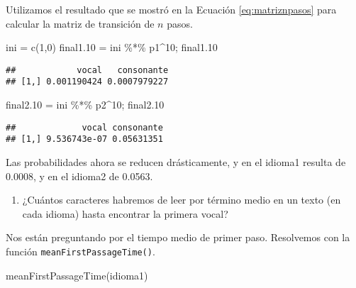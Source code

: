 \documentclass[
]{book}
\newenvironment{Shaded}{\begin{snugshade}}{\end{snugshade}}
\newcommand{\DecValTok}[1]{\textcolor[rgb]{0.00,0.00,0.81}{#1}}
\newcommand{\FloatTok}[1]{\textcolor[rgb]{0.00,0.00,0.81}{#1}}
\newcommand{\FunctionTok}[1]{\textcolor[rgb]{0.00,0.00,0.00}{#1}}
\newcommand{\NormalTok}[1]{#1}
\newcommand{\OtherTok}[1]{\textcolor[rgb]{0.56,0.35,0.01}{#1}}
\newcommand{\SpecialCharTok}[1]{\textcolor[rgb]{0.00,0.00,0.00}{#1}}
\providecommand{\tightlist}{%
  \setlength{\itemsep}{0pt}\setlength{\parskip}{0pt}}
\theoremstyle{definition}
\theoremstyle{definition}
\theoremstyle{definition}
\theoremstyle{definition}
\theoremstyle{remark}
\begin{document}
Utilizamos el resultado que se mostró en la Ecuación \eqref{eq:matriznpasos} para calcular la matriz de transición de \(n\) pasos.

\begin{Shaded}
\begin{Highlighting}[]
\NormalTok{ini }\OtherTok{=} \FunctionTok{c}\NormalTok{(}\DecValTok{1}\NormalTok{,}\DecValTok{0}\NormalTok{)}
\NormalTok{final1}\FloatTok{.10} \OtherTok{=}\NormalTok{ ini }\SpecialCharTok{\%*\%}\NormalTok{ p1}\SpecialCharTok{\^{}}\DecValTok{10}\NormalTok{; final1}\FloatTok{.10}
\end{Highlighting}
\end{Shaded}

\begin{verbatim}
##            vocal   consonante
## [1,] 0.001190424 0.0007979227
\end{verbatim}

\begin{Shaded}
\begin{Highlighting}[]
\NormalTok{final2}\FloatTok{.10} \OtherTok{=}\NormalTok{ ini }\SpecialCharTok{\%*\%}\NormalTok{ p2}\SpecialCharTok{\^{}}\DecValTok{10}\NormalTok{; final2}\FloatTok{.10}
\end{Highlighting}
\end{Shaded}

\begin{verbatim}
##             vocal consonante
## [1,] 9.536743e-07 0.05631351
\end{verbatim}

Las probabilidades ahora se reducen drásticamente, y en el idioma1 resulta de 0.0008, y en el idioma2 de 0.0563.

\begin{enumerate}
\def\labelenumi{\arabic{enumi}.}
\setcounter{enumi}{2}
\tightlist
\item
  ¿Cuántos caracteres habremos de leer por término medio en un texto (en cada idioma) hasta encontrar la primera vocal?
\end{enumerate}

Nos están preguntando por el tiempo medio de primer paso. Resolvemos con la función \texttt{meanFirstPassageTime()}.

\begin{Shaded}
\begin{Highlighting}[]
\FunctionTok{meanFirstPassageTime}\NormalTok{(idioma1)}
\end{Highlighting}
\end{Shaded}
\end{document}
